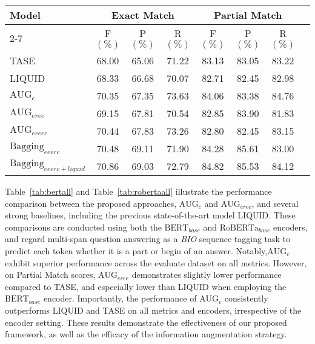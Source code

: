 \begin{table*}[width=\textwidth,cols=8,pos=h]  
	\caption{Approach performance on complete MultiSpanQA valid set based on $\text{RoBERTa}_{base}$.} 
	\label{tab:robertaall}
	\begin{tabular*}{\textwidth}{@{\extracolsep{\fill}}lccccccc}
		\toprule
		\multirow{2}{*}{\textbf{Model}} & \multicolumn{3}{c}{Exact Match} & \multicolumn{3}{c}{Partial Match}  \\
		\cline{2-7} 
		\addlinespace
		& F\((\%)\) & P\((\%)\) & R\((\%)\) & F\((\%)\) & P\((\%)\) & R\((\%)\) \\
		\midrule
		TASE & 68.00 & 65.06 & 71.22 & 83.13 & 83.05 & 83.22 \\ 
		LIQUID & 68.33 & 66.68 & 70.07 & 82.71 & 82.45 & 82.98 \\
		$\text{AUG}_{c}$ & 70.35 & 67.35 & 73.63 & 84.06 & 83.38 & 84.76 \\
		$\text{AUG}_{eree}$ & 69.15 & 67.81 & 70.54 & 82.85 & 83.90 & 81.83 \\
		$\text{AUG}_{ereec}$ & 70.44 & 67.83 & 73.26 & 82.80 & 82.45 & 83.15 \\
		$\text{Bagging}_{eeerc}$ & 70.48  & 69.11 & 71.90 & 84.28 & 85.61 & 83.00 \\
		$\text{Bagging}_{eeerc+liquid}$ & 70.86 & 69.03 & 72.79 & 84.82 & 85.53 & 84.12 \\
		\bottomrule
	\end{tabular*}      
\end{table*}
Table~\ref{tab:bertall} and Table~\ref{tab:robertaall} illustrate the performance comparison between the proposed approaches, $\text{AUG}_{c}$ and $\text{AUG}_{eree}$, and several strong baselines, including the previous state-of-the-art model LIQUID. These comparisons are conducted using both the $\text{BERT}_{base}$ and $\text{RoBERTa}_{base}$ encoders, and regard multi-span question answering as a \textit{BIO} sequence tagging task to predict each token whether it is a part or begin of an answer. 
Notably,$\text{AUG}_{c}$ exhibit superior performance across the evaluate dataset on all metrics. However, on Partial Match scores, $\text{AUG}_{eree}$ demonstrates slightly lower performance compared to TASE, and especially lower than LIQUID when employing the $\text{BERT}_{base}$ encoder.
Importantly, the performance of $\text{AUG}_{c}$ consistently outperforms LIQUID and TASE on all metrics and encoders, irrespective of the encoder setting.
These results demonstrate the effectiveness of our proposed framework, as well as the efficacy of the information augmentation strategy.

